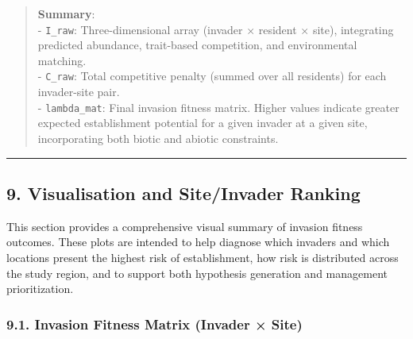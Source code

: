 \documentclass[
]{article}
\newenvironment{Shaded}{\begin{snugshade}}{\end{snugshade}}
\newcommand{\CommentTok}[1]{\textcolor[rgb]{0.56,0.35,0.01}{\textit{#1}}}
\newcommand{\FunctionTok}[1]{\textcolor[rgb]{0.13,0.29,0.53}{\textbf{#1}}}
\newcommand{\NormalTok}[1]{#1}
\newcommand{\OtherTok}[1]{\textcolor[rgb]{0.56,0.35,0.01}{#1}}
\newcommand{\SpecialCharTok}[1]{\textcolor[rgb]{0.81,0.36,0.00}{\textbf{#1}}}
\begin{document}
\begin{Shaded}
\end{Shaded}

\begin{quote}
\textbf{Summary}:\\
- \texttt{I\_raw}: Three-dimensional array (invader × resident × site),
integrating predicted abundance, trait-based competition, and
environmental matching.\\
- \texttt{C\_raw}: Total competitive penalty (summed over all residents)
for each invader-site pair.\\
- \texttt{lambda\_mat}: Final invasion fitness matrix. Higher values
indicate greater expected establishment potential for a given invader at
a given site, incorporating both biotic and abiotic constraints.
\end{quote}

\begin{center}\rule{0.5\linewidth}{0.5pt}\end{center}

\hypertarget{visualisation-and-siteinvader-ranking}{%
\subsection{9. Visualisation and Site/Invader
Ranking}\label{visualisation-and-siteinvader-ranking}}

This section provides a comprehensive visual summary of invasion fitness
outcomes. These plots are intended to help diagnose which invaders and
which locations present the highest risk of establishment, how risk is
distributed across the study region, and to support both hypothesis
generation and management prioritization.

\hypertarget{invasion-fitness-matrix-invader-site}{%
\subsubsection{9.1. Invasion Fitness Matrix (Invader ×
Site)}\label{invasion-fitness-matrix-invader-site}}
\end{document}
